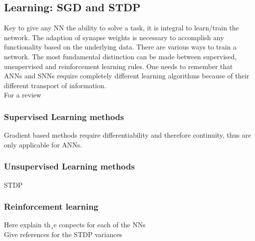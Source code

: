 \subsection{Learning: SGD and STDP}
Key to give any \ac{NN} the ability to solve a task, it is integral to learn/train the network. The adaption of synapse weights is necessary to accomplish any functionality based on the underlying data\cite{zheng_introductory_2022}. There are various ways to train a network. The most fundamental distinction can be made between supervised, unsupervised and reinforcement learning rules.
One needs to remember that \acp{ANN} and \acp{SNN} require completely different learning algorithms because of their different transport of information.\\
For a review

\subsubsection{Supervised Learning methods}
Gradient based methods require differentiability and therefore continuity, thus are only applicable for \acp{ANN}.\\

\subsubsection{Unsupervised Learning methods}
STDP
\subsubsection{Reinforcement learning}



Here explain th¸e conpects for each of the NNs\\
Give references for the STDP variances\\
